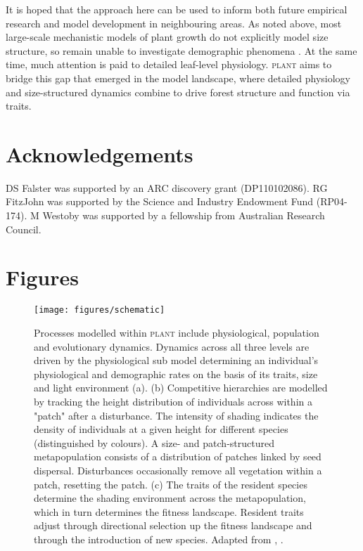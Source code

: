 \documentclass[a4paper,11pt]{article}
\newcommand{\plant}{\textsc{plant}}
\begin{document}
It is hoped that the approach here can be used to inform both future empirical
research and model development in neighbouring areas. As noted above, most
large-scale mechanistic models of plant growth do not explicitly model size
structure, so remain unable to investigate demographic phenomena
\citep{Cramer-2001, Sitch-2003, Kelley-2013,Dekauwe-2014}. At the same time,
much attention is paid to detailed leaf-level physiology. {\plant} aims to bridge
this gap that emerged in the model landscape, where detailed physiology and
size-structured dynamics combine to drive forest structure and function via
traits.

\section{Acknowledgements}

DS Falster was supported by an ARC discovery grant (DP110102086). RG
FitzJohn was supported by the Science and Industry Endowment Fund
(RP04-174). M Westoby was supported by a fellowship from Australian
Research Council.

\clearpage


\clearpage

\section{Figures}\label{figures}

\begin{figure}[h!]
\centering
\texttt{[image: figures/schematic]}

\caption{Processes modelled within {\plant} include physiological, population and
evolutionary dynamics.
Dynamics across all three levels are driven by the
physiological sub model determining an individual's physiological and
demographic rates on the basis of its traits, size and light environment (a).
(b) Competitive hierarchies  are modelled by tracking the height distribution of
individuals across within a "patch" after a disturbance. The intensity
of shading indicates the density of individuals at a given height for
different species (distinguished by colours). A size- and patch-structured
metapopulation consists of a distribution of patches linked by seed dispersal.
Disturbances occasionally remove all vegetation within a patch, resetting the
patch. (c) The traits of the resident species determine the shading environment
across the metapopulation, which in turn determines the fitness landscape.
Resident traits adjust through directional selection up the fitness landscape
and through the introduction of new species. Adapted from
\citet{Falster-2011}, \citet{Falster-2015}. }

\label{fig:schematic}
\end{figure}
\end{document}
